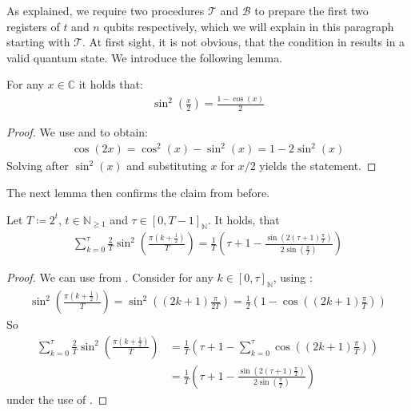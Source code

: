 As explained, we require two procedures \(\mathcal{T}\) and \(\mathcal{B}\) to prepare the first two registers of \(t\) and \(n\) qubits respectively, which we will explain in this paragraph starting with \(\mathcal{T}\). At first sight, it is not obvious, that the condition in  results in a valid quantum state. We introduce the following lemma.
\begin{lemma} \label{some_trigonometry_lemma}
    For any \(x \in \mathbb{C}\) it holds that:
    \begin{align}
        \sin^2\left(\frac{x}{2}\right) = \frac{1-\cos(x)}{2}
    \end{align}
\end{lemma}
\begin{proof}
    We use  and  to obtain:
    \begin{align}
        \cos(2x) = \cos^2(x)-\sin^2(x) = 1-2\sin^2(x)
    \end{align}
    Solving after \(\sin^2(x)\) and substituting \(x\) for \(x/2\) yields the statement.
\end{proof}
The next lemma then confirms the claim from before.
\begin{lemma} \label{sine_distr_lemma}
    Let \(T \coloneqq 2^t\), \(t \in \mathbb{N}_{\geq 1}\) and \(\tau \in [0, T-1]_{\mathbb{N}}\). It holds, that
    \begin{align}
        \sum_{k = 0}^{\tau} \frac{2}{T} \sin^2\left(\frac{\pi(k+\frac{1}{2})}{T}\right) = \frac{1}{T}\left(\tau + 1 - \frac{\sin\left(2(\tau+1)\frac{\pi}{T}\right)}{2\sin\left(\frac{\pi}{T}\right)}\right)
    \end{align}
\end{lemma}
\begin{proof}
    We can use  from . Consider for any \(k \in [0, \tau]_{\mathbb{N}}\), using :
    \begin{align}
        \sin^2\left(\frac{\pi(k+\frac{1}{2})}{T}\right) = \sin^2\left((2k+1)\frac{\pi}{2T}\right) = \frac{1}{2} \left(1-\cos\left((2k+1)\frac{\pi}{T}\right)\right)
    \end{align}
    So
    \begin{align}
        \sum_{k = 0}^{\tau} \frac{2}{T} \sin^2\left(\frac{\pi(k+\frac{1}{2})}{T}\right) &= \frac{1}{T}\left(\tau + 1 - \sum_{k=0}^\tau \cos\left((2k+1)\frac{\pi}{T}\right)\right)\\
        &= \frac{1}{T}\left(\tau + 1 - \frac{\sin\left(2(\tau + 1)\frac{\pi}{T}\right)}{2\sin\left(\frac{\pi}{T}\right)}\right)
    \end{align}
    under the use of .
\end{proof}
